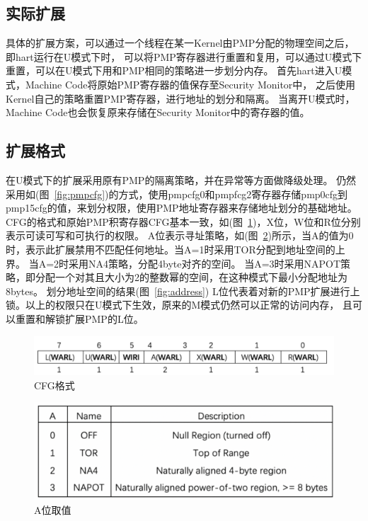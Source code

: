 \subsection{实际扩展}
具体的扩展方案，可以通过一个线程在某一Kernel由PMP分配的物理空间之后，即hart运行在U模式下时，
可以将PMP寄存器进行重置和复用，可以通过U模式下重置，可以在U模式下用和PMP相同的策略进一步划分内存。
首先hart进入U模式，Machine Code将原始PMP寄存器的值保存至Security Monitor中，
之后使用Kernel自己的策略重置PMP寄存器，进行地址的划分和隔离。
当离开U模式时，Machine Code也会恢复原来存储在Security Monitor中的寄存器的值。



\subsection{扩展格式}
在U模式下的扩展采用原有PMP的隔离策略，并在异常等方面做降级处理。
仍然采用如(图~\ref{fig:pmpcfg})的方式，使用pmpcfg0和pmpfcg2寄存器存储pmp0cfg到pmp15cfg的值，来划分权限，使用PMP地址寄存器来存储地址划分的基础地址。
CFG的格式和原始PMP积寄存器CFG基本一致，如(图~\ref{fig:cfgformat})，X位，W位和R位分别表示可读可写和可执行的权限。
A位表示寻址策略，如(图~\ref{fig:afield})所示，当A的值为0时，表示此扩展禁用不匹配任何地址。当A=1时采用TOR分配到地址空间的上界。
当A=2时采用NA4策略，分配4byte对齐的空间。
当A=3时采用NAPOT策略，即分配一个对其且大小为2的整数幂的空间，在这种模式下最小分配地址为8bytes。
划分地址空间的结果(图~\ref{fig:address})
L位代表着对新的PMP扩展进行上锁。以上的权限只在U模式下生效，原来的M模式仍然可以正常的访问内存，
且可以重置和解锁扩展PMP的L位。
\begin{figure}
    \centering
    \includegraphics[scale=0.30]{Figures/extend/cfgformat.png}
    \decoRule
    \caption{CFG格式}
    \label{fig:cfgformat}
\end{figure}
\begin{figure}
    \centering
    \includegraphics[scale=0.40]{Figures/extend/afield.png}
    \decoRule
    \caption{A位取值}
    \label{fig:afield}
\end{figure}
